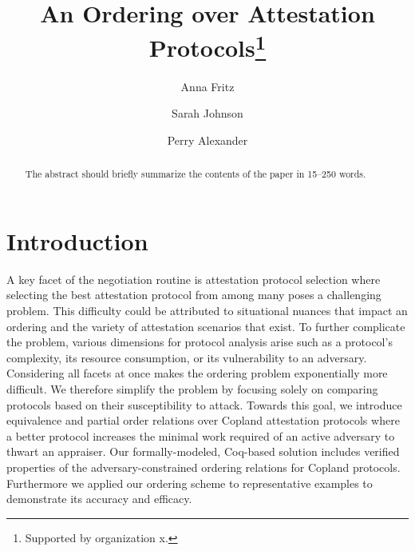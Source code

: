 \documentclass[runningheads]{llncs}
\theoremstyle{definition}
\begin{document}
%
\title{An Ordering over Attestation Protocols\thanks{Supported by organization x.}}
%
%
\author{Anna Fritz \and
Sarah Johnson \and
Perry Alexander}
%
%
%
\maketitle              %
%
\begin{abstract}
The abstract should briefly summarize the contents of the paper in
15--250 words.

\end{abstract}
%
%
%
\section{Introduction}
A key facet of the negotiation routine is attestation protocol selection where selecting the best attestation protocol from among many poses a challenging problem. This difficulty could be attributed to situational nuances that impact an ordering and the variety of attestation scenarios that exist. To further complicate the problem, various dimensions for protocol analysis arise such as a protocol's complexity, its resource consumption, or its vulnerability to an adversary. Considering all facets at once makes the ordering problem exponentially more difficult. We therefore simplify the problem by focusing solely on comparing protocols based on their susceptibility to attack. Towards this goal, we introduce equivalence and partial order relations over Copland attestation protocols where a better protocol increases the minimal work required of an active adversary to thwart an appraiser. Our formally-modeled, Coq-based solution includes verified properties of the adversary-constrained ordering relations for Copland protocols. Furthermore we applied our ordering scheme to representative examples to demonstrate its accuracy and efficacy.
\end{document}
